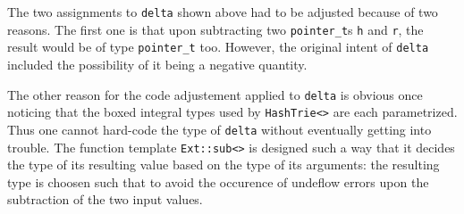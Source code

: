 \documentclass[a4paper,11pt]{article}
\renewcommand{\=}{\protect\nobreakdash-\hspace{0pt}}
\renewcommand{\~}{\protect\nobreakdash--\hspace{0pt}}
\newcommand{\code}[1]{{\tt{#1}}}
\newcommand\code*[1]{\mbox{\code{#1}}}
\begin{document}
The two assignments to \code{delta} shown above had to be adjusted because of
two reasons. The first one is that upon subtracting two \code{pointer\_t}s
\code{h} and \code{r}, the result would be of type \code{pointer\_t} too.
However, the original intent of \code{delta} included the possibility of it
being a negative quantity. 

The other reason for the code adjustement applied to \code{delta} is obvious
once noticing that the boxed integral types used by \code{HashTrie<>} are each
parametrized. Thus one cannot hard-code the type of \code{delta} without
eventually getting into trouble. The function template \code{Ext::sub<>}
is designed such a way that it decides the type of its resulting value based
on the type of its arguments: the resulting type is choosen such that to avoid
the occurence of undeflow errors upon the subtraction of the two input
values.
%
\end{document}
